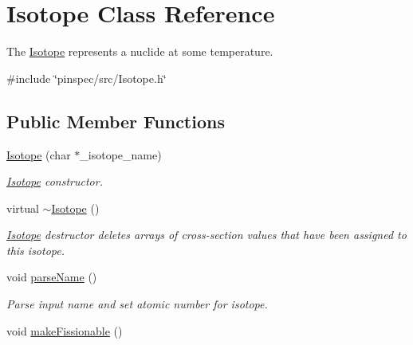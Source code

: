 \hypertarget{classIsotope}{\section{Isotope Class Reference}
\label{classIsotope}
}


The \hyperlink{classIsotope}{Isotope} represents a nuclide at some temperature.  




{\ttfamily \#include \char`\"{}pinspec/src/\-Isotope.\-h\char`\"{}}

\subsection*{Public Member Functions}
\begin{DoxyCompactItemize}
\item 
\hyperlink{classIsotope_a51ff93cb15b7956c86dcc7a80aec52f7}{Isotope} (char $\ast$\-\_\-isotope\-\_\-name)
\begin{DoxyCompactList}\small\item\em \hyperlink{classIsotope}{Isotope} constructor. \end{DoxyCompactList}\item 
\hypertarget{classIsotope_a7b22935e0ade348ee513733eeda1fa23}{virtual \hyperlink{classIsotope_a7b22935e0ade348ee513733eeda1fa23}{$\sim$\-Isotope} ()}\label{classIsotope_a7b22935e0ade348ee513733eeda1fa23}

\begin{DoxyCompactList}\small\item\em \hyperlink{classIsotope}{Isotope} destructor deletes arrays of cross-\/section values that have been assigned to this isotope. \end{DoxyCompactList}\item 
\hypertarget{classIsotope_a8f2edf586499fff80ecee7cbdc28bd0e}{void \hyperlink{classIsotope_a8f2edf586499fff80ecee7cbdc28bd0e}{parse\-Name} ()}\label{classIsotope_a8f2edf586499fff80ecee7cbdc28bd0e}

\begin{DoxyCompactList}\small\item\em Parse input name and set atomic number for isotope. \end{DoxyCompactList}\item 
\hypertarget{classIsotope_a9adedaf6a1bd4cee536c4684d6adaf65}{void \hyperlink{classIsotope_a9adedaf6a1bd4cee536c4684d6adaf65}{make\-Fissionable} ()}\label{classIsotope_a9adedaf6a1bd4cee536c4684d6adaf65}


\end{DoxyCompactItemize}
